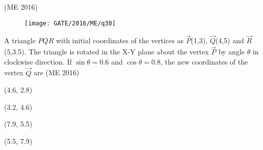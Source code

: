 	  \hfill(ME 2016)
          \begin{figure}[H]
              \centering
              \texttt{[image: GATE/2016/ME/q30]}
              \caption{}
              \label{q30}
          \end{figure}
    \item A triangle $PQR$ with initial coordinates of the vertices as $\vec{P}$(1,3), $\vec{Q}$(4,5) and $\vec{R}$(5,3.5). The triangle is rotated in the X-Y plane about the vertex $\vec{P}$ by angle $\theta$ in clockwise direction. If $\sin \theta = 0.6$ and $\cos \theta = 0.8$, the new coordinates of the vertex $\vec{Q}$ are
	  \hfill(ME 2016)
          \begin{enumerate}
              \begin{multicols}{4}

                  \item (4.6, 2.8)

                  \item (3.2, 4.6)

                  \item (7.9, 5.5)

                  \item (5.5, 7.9)

              \end{multicols}

          \end{enumerate}
